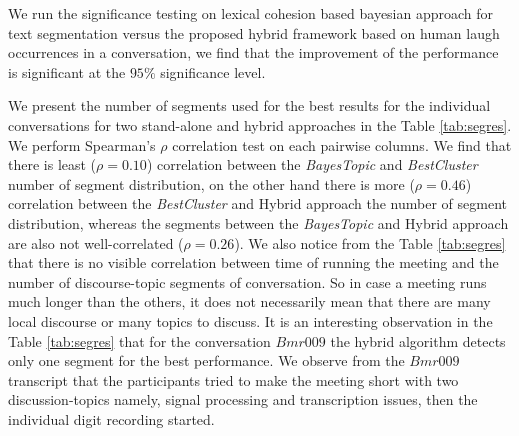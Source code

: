\documentclass{article}
\begin{document}
We run the significance testing on lexical cohesion based bayesian approach for text segmentation versus the proposed hybrid framework based on human laugh occurrences in a conversation, we find that the improvement of the performance is significant at the $95\%$ significance level.

We present the number of segments used for the best results for the individual conversations for two stand-alone and hybrid approaches in the Table \ref{tab:segres}. We perform Spearman's $\rho$ correlation test on each pairwise columns. We find that there is least ($\rho=0.10$) correlation between the \emph{BayesTopic} and \emph{BestCluster} number of segment distribution, on the other hand there is more ($\rho=0.46$) correlation between the \emph{BestCluster} and Hybrid approach the number of segment distribution, whereas the segments between the \emph{BayesTopic} and Hybrid approach are also not well-correlated ($\rho=0.26$). We also notice from the Table \ref{tab:segres} that there is no visible correlation between time of running the meeting and the number of discourse-topic segments of conversation. So in case a meeting runs much longer than the others, it does not necessarily mean that there are many local discourse or many topics to discuss. It is an interesting observation in the Table \ref{tab:segres} that for the conversation $Bmr009$ the hybrid algorithm detects only one segment for the best performance. We observe from the $Bmr009$ transcript that the participants tried to make the meeting short with two discussion-topics namely, signal processing and transcription issues, then the individual digit recording started.  
\end{document}
